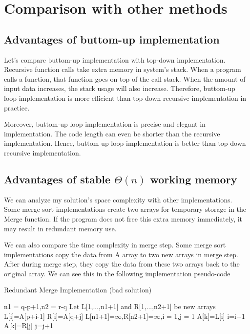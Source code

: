 \documentclass{report}
\begin{document}
\section{Comparison with other methods}

\subsection{Advantages of buttom-up implementation}
Let's compare buttom-up implementation with top-down implementation.
Recursive function calls take extra memory in system's stack.
When a program calls a function, that function goes on top of the call stack.
When the amount of input data increases, the stack usage will also increase.
Therefore, buttom-up loop implementation is more efficient than top-down recursive implementation in practice.

\noindent
Moreover, buttom-up loop implementation is precise and elegant in implementation.
The code length can even be shorter than the recursive implementation.
Hence, buttom-up loop implementation is better than top-down recursive implementation.

\subsection{Advantages of stable $\Theta(n)$ working memory}

We can analyze my solution's space complexity with other implementations.
Some merge sort implementations create two arrays for temporary storage in the Merge function.
If the program does not free this extra memory immediately, it may result in redundant memory use.

We can also compare the time complexity in merge step.
Some merge sort implementations copy the data from A array to two new arrays in merge step.
After during merge step, they copy the data from these two arrays back to the original array.
We can see this in the following implementation pseudo-code

\begin{algorithm}[htbp]
    \caption{Redundant Merge Implementation (bad solution)}
    \begin{algorithmic}[1]
            \State n1 = q-p+1,n2 = r-q
            Let L[1,...,n1+1] and R[1,...,n2+1] be new arrays
                \State L[i]=A[p+i-1]
            \EndFor
                \State R[i]=A[q+j]
            \EndFor
            \State L[n1+1]=$\infty$,R[n2+1]=$\infty$,i = 1,j = 1
                    \State A[k]=L[i]
                    \State i=i+1
                \Else
                    \State A[k]=R[j]
                    \State j=j+1
                \EndIf
            \EndFor
        \EndFunction
    \end{algorithmic}
\end{algorithm}
\end{document}
